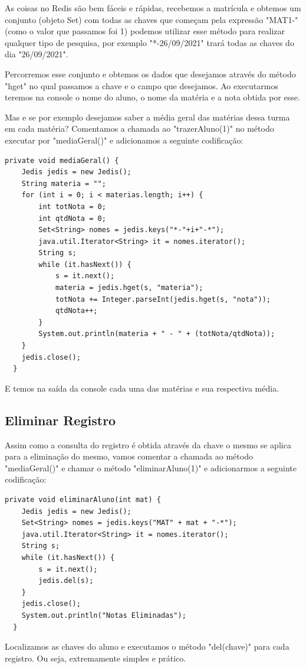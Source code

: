 As coisas no Redis são bem fáceis e rápidas, recebemos a matrícula e obtemos um conjunto (objeto Set) com todas as chaves que começam pela expressão "MAT1-" (como o valor que passamos foi 1) podemos utilizar esse método para realizar qualquer tipo de pesquisa, por exemplo "*-26/09/2021" trará todas as chaves do dia "26/09/2021". 

Percorremos esse conjunto e obtemos os dados que desejamos através do método "hget" no qual passamos a chave e o campo que desejamos. Ao executarmos teremos na console o nome do aluno, o nome da matéria e a nota obtida por esse.

Mas e se por exemplo desejamos saber a média geral das matérias dessa turma em cada matéria? Comentamos a chamada ao "trazerAluno(1)" no método executar por "mediaGeral()" e adicionamos a seguinte codificação:
\begin{lstlisting}[]
  private void mediaGeral() {
	Jedis jedis = new Jedis();
	String materia = "";
	for (int i = 0; i < materias.length; i++) { 
		int totNota = 0;
		int qtdNota = 0;
		Set<String> nomes = jedis.keys("*-"+i+"-*");
		java.util.Iterator<String> it = nomes.iterator();
		String s;
		while (it.hasNext()) {
			s = it.next();
			materia = jedis.hget(s, "materia");
			totNota += Integer.parseInt(jedis.hget(s, "nota"));
			qtdNota++;
		}
		System.out.println(materia + " - " + (totNota/qtdNota));
	}
	jedis.close();
  }	
\end{lstlisting}

E temos na saída da console cada uma das matérias e sua respectiva média.

\subsection{Eliminar Registro}
Assim como a consulta do registro é obtida através da chave o mesmo se aplica para a eliminação do mesmo, vamos comentar a chamada ao método "mediaGeral()" e chamar o método "eliminarAluno(1)" e adicionarmos a seguinte  codificação:
\begin{lstlisting}[]
  private void eliminarAluno(int mat) {
	Jedis jedis = new Jedis();
	Set<String> nomes = jedis.keys("MAT" + mat + "-*");
	java.util.Iterator<String> it = nomes.iterator();
	String s;
	while (it.hasNext()) {
		s = it.next();
		jedis.del(s);
	}
	jedis.close();
	System.out.println("Notas Eliminadas");
  } 	
\end{lstlisting}

Localizamos as chaves do aluno e executamos o método "del(chave)" para cada registro. Ou seja, extremamente simples e prático.

